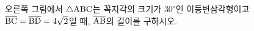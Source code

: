 \noindent\begin{minipage}[t]{0.58\linewidth}\vspace{0pt}\raggedright 오른쪽 그림에서 $\triangle\mathrm{ABC}$는 꼭지각의 크기가 $30^\circ$인 이등변삼각형이고 $\overline{\mathrm{BC}}=\overline{\mathrm{BD}}=4\sqrt{2}$일 때, $\overline{\mathrm{AB}}$의 길이를 구하시오.\end{minipage}\hfill\begin{minipage}[t]{0.4\linewidth}\vspace{0pt}\centering \resizebox{\ifdim\width>\linewidth\linewidth\else\width\fi}{!}{}\end{minipage}\par
